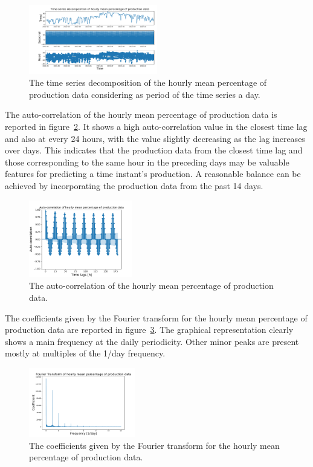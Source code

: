 \begin{figure}[H]
\centering
\includegraphics[width=0.5\textwidth]{images/production/hourly_decomposition}
\caption{The time series decomposition of the hourly mean percentage of production data considering as period of the time series a day.}
\label{fig:productiondecomposition}
\end{figure}

The auto-correlation of the hourly mean percentage of production data is reported in figure~\ref{fig:productioncorrelation}.
It shows a high auto-correlation value in the closest time lag and also at every 24 hours, with the value slightly decreasing as the lag increases over days.
This indicates that the production data from the closest time lag and those corresponding to the same hour in the preceding days may be valuable features for predicting a time instant's production.
A reasonable balance can be achieved by incorporating the production data from the past 14 days.

\begin{figure}[H]
\centering
\includegraphics[width=0.4\textwidth]{images/production/hourly_correlation_week_range}
\caption{The auto-correlation of the hourly mean percentage of production data.}
\label{fig:productioncorrelation}
\end{figure}

The coefficients given by the Fourier transform for the hourly mean percentage of production data are reported in figure~\ref{fig:productionft}.
The graphical representation clearly shows a main frequency at the daily periodicity.
Other minor peaks are present mostly at multiples of the 1/day frequency.

\begin{figure}[H]
\centering
\includegraphics[width=0.415\textwidth]{images/production/ft_hour_day}
\caption{The coefficients given by the Fourier transform for the hourly mean percentage of production data.}
\label{fig:productionft}
\end{figure}

